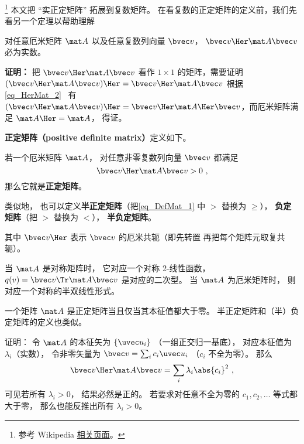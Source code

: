 


\footnote{参考 Wikipedia \href{https://en.wikipedia.org/wiki/Definite_matrix}{相关页面}。}
本文把 “实正定矩阵” 拓展到复数矩阵。 在看复数的正定矩阵的定义前，我们先看另一个定理以帮助理解

\begin{theorem}{}
对任意厄米矩阵 $\mat A$ 以及任意复数列向量 $\bvec v$， $\bvec v\Her \mat A \bvec v$ 必为实数。
\end{theorem}
\textbf{证明：} 把 $\bvec v\Her \mat A \bvec v$ 看作 $1\times 1$ 的矩阵，需要证明 $(\bvec v\Her \mat A \bvec v)\Her = \bvec v\Her \mat A \bvec v$ 根据\autoref{eq_HerMat_2}~ 有 $(\bvec v\Her \mat A \bvec v)\Her = \bvec v\Her \mat A\Her \bvec v$，而厄米矩阵满足 $\mat A\Her=\mat A$， 得证。

\textbf{正定矩阵（positive definite matrix）}定义如下。
\begin{definition}{}
若一个厄米矩阵 $\mat A$， 对任意非零复数列向量 $\bvec v$ 都满足
\begin{equation}\label{eq_DefMat_1}
\bvec v\Her \mat A\bvec v > 0~,
\end{equation}
那么它就是\textbf{正定矩阵}。

类似地， 也可以定义\textbf{半正定矩阵}（把\autoref{eq_DefMat_1} 中 $>$ 替换为 $\geqslant$）， \textbf{负定矩阵}（把 $>$ 替换为 $<$）， \textbf{半负定矩阵}。
\end{definition}
其中 $\bvec v\Her$ 表示 $\bvec v$ 的厄米共轭（即先转置 再把每个矩阵元取复共轭）。

当 $\mat A$ 是对称矩阵时， 它对应一个对称 2-线性函数， $q(v) = \bvec v\Tr \mat A \bvec v$ 是对应的二次型。 当 $\mat A$ 为厄米矩阵时， 则对应一个对称的半双线性形式。

\begin{theorem}{}
一个矩阵 $\mat A$ 是正定矩阵当且仅当其本征值都大于零。 半正定矩阵和（半）负定矩阵的定义也类似。
\end{theorem}

证明： 令 $\mat A$ 的本征矢为 $\{\uvec u_i\}$ （一组正交归一基底）， 对应本征值为 $\lambda_i$（实数）， 令非零矢量为 $\bvec v = \sum_i c_i \uvec u_i$ （$c_i$ 不全为零）。 那么
\begin{equation}
\bvec v\Her \mat A \bvec v = \sum_i \lambda_i \abs{c_i}^2~,
\end{equation}
可见若所有 $\lambda_i > 0$， 结果必然是正的。 若要求对任意不全为零的 $c_1,c_2,\dots$ 等式都大于零， 那么也能反推出所有 $\lambda_i > 0$。

